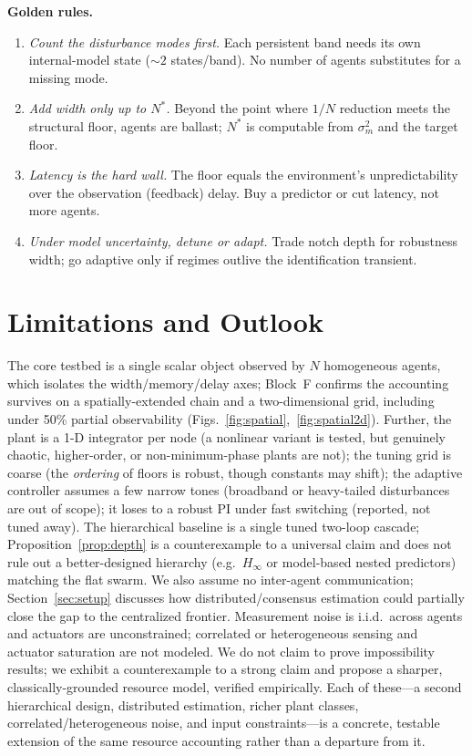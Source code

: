 \documentclass[journal]{IEEEtran}
\begin{document}
\textbf{Golden rules.}
\begin{enumerate}
\item \emph{Count the disturbance modes first.} Each persistent band needs its
own internal-model state ($\sim 2$ states/band). No number of agents substitutes
for a missing mode.
\item \emph{Add width only up to $N^\ast$.} Beyond the point where $1/N$
reduction meets the structural floor, agents are ballast; $N^\ast$ is computable
from $\sigma_m^2$ and the target floor.
\item \emph{Latency is the hard wall.} The floor equals the environment's
unpredictability over the observation (feedback) delay. Buy a predictor or cut latency, not
more agents.
\item \emph{Under model uncertainty, detune or adapt.} Trade notch depth for
robustness width; go adaptive only if regimes outlive the identification
transient.
\end{enumerate}

\section{Limitations and Outlook}
\label{sec:limits}
The core testbed is a single scalar object observed by $N$ homogeneous agents,
which isolates the width/memory/delay axes; Block~F confirms the accounting
survives on a spatially-extended chain and a two-dimensional grid, including
under 50\% partial observability (Figs.~\ref{fig:spatial},~\ref{fig:spatial2d}).
Further, the plant is a 1-D integrator per node (a nonlinear variant is tested,
but genuinely chaotic, higher-order, or non-minimum-phase plants are not); the
tuning grid is coarse (the \emph{ordering} of floors is robust, though constants
may shift); the adaptive controller assumes a few narrow tones (broadband or
heavy-tailed disturbances are out of scope); it loses to a robust PI under fast
switching (reported, not tuned away). The hierarchical baseline is a single
tuned two-loop cascade; Proposition~\ref{prop:depth} is a counterexample to a
universal claim and does not rule out a better-designed hierarchy (e.g.\
$H_\infty$ or model-based nested predictors) matching the flat swarm. We also
assume no inter-agent communication; Section~\ref{sec:setup} discusses how
distributed/consensus estimation could partially close the gap to the
centralized frontier. Measurement noise is i.i.d.\ across agents and actuators
are unconstrained; correlated or heterogeneous sensing and actuator saturation
are not modeled. We do not claim to prove impossibility results; we exhibit a
counterexample to a strong claim and propose a sharper, classically-grounded
resource model, verified empirically. Each of these---a second hierarchical
design, distributed estimation, richer plant classes, correlated/heterogeneous
noise, and input constraints---is a concrete, testable extension of the same
resource accounting rather than a departure from it.
\end{document}
